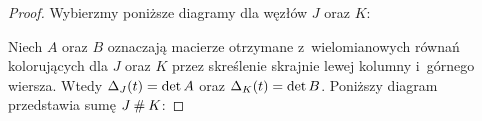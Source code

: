\begin{proof}
    Wybierzmy poniższe diagramy dla węzłów $J$ oraz $K$:
\begin{comment}
    \[\begin{tikzpicture}[baseline=-0.65ex, scale=0.07]
    \begin{knot}[clip width=5, end tolerance=1pt]
        \strand[semithick] (-70, -10) rectangle (-30, 10);
        \strand[semithick] ( 30, -10) rectangle ( 70, 10);
        \strand[semithick,Latex-] (-30, 5) .. controls (-22, 5) and (-18, -5) .. (-10, -5);
        \strand[semithick] (-30,-5) .. controls (-22, -5) and (-18, 5) .. (-10,  5);
        \strand[semithick] (-10, 5) [in=up, out=right] to (-5, 0) [in=right, out=down] to (-10, -5);

        \strand[semithick,-Latex] (30, 5) .. controls (22, 5) and (18, -5) .. (10, -5);
        \strand[semithick] (30,-5) .. controls (22, -5) and (18, 5) .. (10,  5);
        \strand[semithick] (10, 5) [in=up, out=left] to (5, 0) [in=left, out=down] to (10, -5);

        \node[darkblue] at (-50,5) {$x_1,\ldots,x_{m-1}$};
        \node[red] at (-50,-5) {$1,\ldots,m$};

        \node[darkblue] at (50,5) {$y_1,\ldots,y_{n-1}$};
        \node[red] at (50,-5) {$1,\ldots,n$};

        \node[darkblue] at (-30,-5)[below right] {$x_m$};
        \node[darkblue] at (-15,-5)[below] {$x_0$};
        \node[darkblue] at (30,-5)[below left] {$y_n$};
        \node[darkblue] at (15,-5)[below] {$y_0$};
        \node[red] at ( 19.5,  1)[above]{$0$};
        \node[red] at (-19.5,  1)[above]{$0$};
    \end{knot}
    \end{tikzpicture}
\]
\end{comment}
    Niech $A$ oraz $B$ oznaczają macierze otrzymane z~wielomianowych równań kolorujących dla $J$ oraz $K$ przez skreślenie skrajnie lewej kolumny i~górnego wiersza.
    Wtedy $\Delta_J(t) = \det A$ oraz $\Delta_K(t) = \det B$.
    Poniższy diagram przedstawia sumę $J \mathbin{\#} K$:

\begin{comment}
\[\begin{tikzpicture}[baseline=-0.65ex, scale=0.07]
    \begin{knot}[clip width=5, end tolerance=1pt]
        \strand[semithick] (-70, -10) rectangle (-30, 10);
        \strand[semithick] ( 30, -10) rectangle ( 70, 10);
        \strand[semithick,Latex-] (-30, 5) .. controls (-22, 5) and (-18, -5) .. (-10, -5);
        \strand[semithick] (-30,-5) .. controls (-22, -5) and (-18, 5) .. (-10,  5);


\end{comment}
\end{proof}
